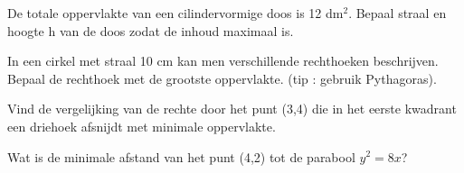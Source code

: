 \documentclass[12pt]{article}
\begin{document}
\begin{oefening}
  De totale oppervlakte van een cilindervormige doos is 12 dm$^2$. Bepaal straal en hoogte h van de doos zodat de inhoud maximaal is.
\end{oefening}

\begin{oefening}
  In een cirkel met straal 10 cm kan men verschillende rechthoeken beschrijven. Bepaal de rechthoek met de grootste oppervlakte. (tip : gebruik Pythagoras).
\end{oefening}

\begin{oefening}
  Vind de vergelijking van de rechte door het punt (3,4) die in het eerste kwadrant een
  driehoek afsnijdt met minimale oppervlakte.
\end{oefening}

\begin{oefening}
  Wat is de minimale afstand van het punt (4,2) tot de parabool $y^2 = 8x$?
\end{oefening}


\end{document}

